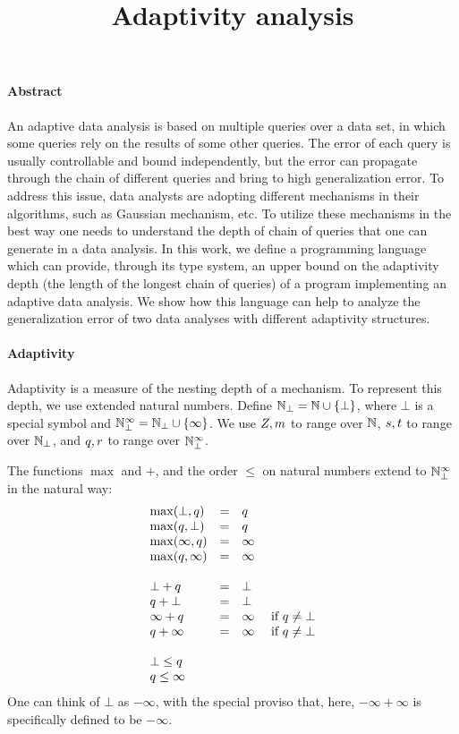 \documentclass[a4paper,11pt]{article}
\title{Adaptivity analysis}
\author{}
\date{}
\theoremstyle{definition}
\begin{document}
\maketitle

\paragraph{Abstract}
An adaptive data analysis is based on multiple queries over a data set, in which some queries rely on the results of some other queries. The error of each query is usually controllable and bound independently, but the error can propagate through the chain of different queries and bring to high generalization error. To address this issue, data analysts are adopting different mechanisms in their algorithms, such as Gaussian mechanism, etc. To utilize these mechanisms in the best way one needs to understand the depth of chain of queries that one can generate in a data analysis. In this work, we define a programming language which can provide, through its type system, an upper bound on the adaptivity  depth (the length of the longest chain of queries) of a program implementing an adaptive data analysis. We show how this language can help to analyze the generalization error of two data analyses with different adaptivity structures.

\paragraph{Adaptivity}
Adaptivity is a measure of the nesting depth of a mechanism. To
represent this depth, we use extended natural numbers. Define $\mathbb{N}_{\bot} =
\mathbb{N} \cup \{\bot\}$, where $\bot$ is a special symbol and $\mathbb{N}_{\bot}^\infty =
\mathbb{N}_{\bot} \cup \{\infty\}$. We use $Z, m$ to range over $\mathbb{N}$,
$s, t$ to range over $\mathbb{N}_{\bot}$, and $q, r$ to
range over $\mathbb{N}_{\bot}^\infty$.

The functions $\max$ and $+$, and the order $\leq$ on natural numbers
extend to $\mathbb{N}_{\bot}^\infty$ in the natural way:
\[\begin{array}{lcl}
\max(\bot, \nnatbiA) & = & \nnatbiA \\
\max(\nnatbiA, \bot) & = & \nnatbiA \\
\max(\infty, \nnatbiA) & = & \infty \\
\max(\nnatbiA, \infty) & = & \infty \\
\\
%
\bot + \nnatbiA & = & \bot \\
\nnatbiA + \bot & = & \bot \\
\infty + \nnatbiA & = & \infty ~~~~ \mbox{if } \nnatbiA \neq \bot \\
\nnatbiA + \infty & = & \infty ~~~~ \mbox{if } \nnatbiA \neq \bot \\
\\
%
\bot \leq \nnatbiA \\
\nnatbiA \leq \infty
\end{array}
\]
One can think of $\bot$ as $-\infty$, with the special proviso that,
here, $-\infty + \infty$ is specifically defined to be $-\infty$.
\end{document}
